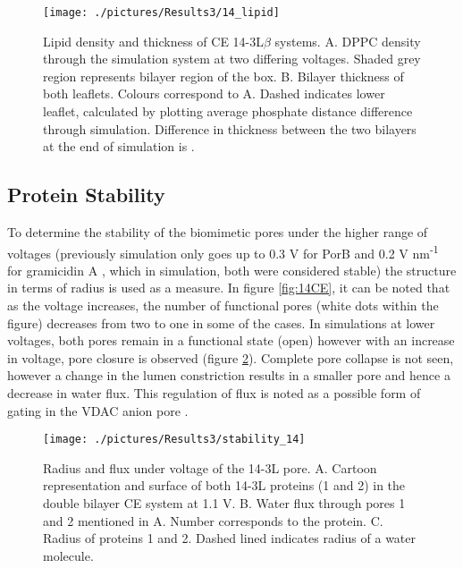 \begin{figure}[H]
\begin{center}
\texttt{[image: ./pictures/Results3/14\_lipid]}
\caption[Lipid density and thickness of CE 14-3L$\beta$ systems.] {Lipid density and thickness of CE 14-3L$\beta$ systems. A. DPPC density through the simulation system at two differing voltages. Shaded grey region represents bilayer region of the box. B. Bilayer thickness of both leaflets. Colours correspond to A. Dashed indicates lower leaflet, calculated by plotting average phosphate distance difference through simulation. Difference in thickness between the two bilayers at the end of simulation is  \angstrom.}
\label{fig:14_lipid}
\end{center}
\end{figure}  

\subsection*{Protein Stability}

To determine the stability of the biomimetic pores under the higher range of voltages (previously simulation only goes up to 0.3 V \cite{Kutzner2011} for PorB and 0.2 V nm\textsuperscript{-1} for gramicidin A \cite{Siu2007}, which in simulation, both were considered stable) the structure in terms of radius is used as a measure. In figure \ref{fig:14CE}, it can be noted that as the voltage increases, the number of functional pores (white dots within the figure) decreases from two to one in some of the cases. In simulations at lower voltages, both pores remain in a functional state (open) however with an increase in voltage, pore closure is observed (figure \ref{fig:stability_14}). Complete pore collapse is not seen, however a change in the lumen constriction results in a smaller pore and hence a decrease in water flux. This regulation of flux is noted as a possible form of gating in the VDAC anion pore \cite{Zachariae2012b}. 

\begin{figure}[H]
\begin{center}
\texttt{[image: ./pictures/Results3/stability\_14]}
\caption[Radius and flux under voltage of the 14-3L pore.] {Radius and flux under voltage of the 14-3L pore. A. Cartoon representation and surface of both 14-3L proteins (1 and 2) in the double bilayer CE system at 1.1 V. B. Water flux through pores 1 and 2 mentioned in A. Number corresponds to the protein. C. Radius of proteins 1 and 2. Dashed lined indicates radius of a water molecule.}
\label{fig:stability_14}
\end{center}
\end{figure}  

